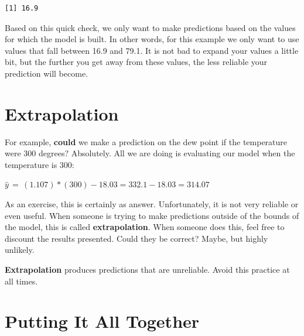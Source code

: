 \documentclass[
  letterpaper,
  DIV=11,
  numbers=noendperiod]{scrreprt}
\begin{document}
\begin{verbatim}
[1] 16.9
\end{verbatim}

Based on this quick check, we only want to make predictions based on the
values for which the model is built. In other words, for this example we
only want to use values that fall between 16.9 and 79.1. It is not bad
to expand your values a little bit, but the further you get away from
these values, the less reliable your prediction will become.

\section*{Extrapolation}\label{extrapolation}


For example, \textbf{could} we make a prediction on the dew point if the
temperature were 300 degrees? Absolutely. All we are doing is evaluating
our model when the temperature is 300:

\(\hat{y} \, = \, (1.107)*(300) - 18.03 = 332.1 - 18.03 = 314.07\)

As an exercise, this is certainly as answer. Unfortunately, it is not
very reliable or even useful. When someone is trying to make predictions
outside of the bounds of the model, this is called
\textbf{extrapolation}. When someone does this, feel free to discount
the results presented. Could they be correct? Maybe, but highly
unlikely.

\begin{tcolorbox}[enhanced jigsaw, bottomrule=.15mm, breakable, toprule=.15mm, leftrule=.75mm, rightrule=.15mm, opacitybacktitle=0.6, left=2mm, title=\textcolor{quarto-callout-important-color}{\faExclamation}\hspace{0.5em}{Important}, bottomtitle=1mm, arc=.35mm, colbacktitle=quarto-callout-important-color!10!white, titlerule=0mm, toptitle=1mm, colframe=quarto-callout-important-color-frame, colback=white, opacityback=0, coltitle=black]

\textbf{Extrapolation} produces predictions that are unreliable. Avoid
this practice at all times.

\end{tcolorbox}

\section*{Putting It All Together}\label{putting-it-all-together}
\end{document}
